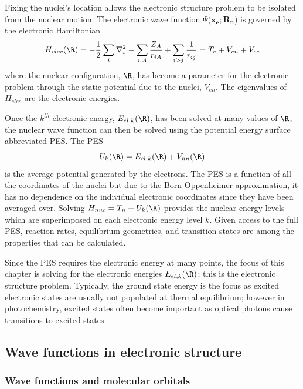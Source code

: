 \documentclass[11pt,oneside,final]{huthesis}%
\begin{document}
Fixing the nuclei's location allows the electronic structure problem to be isolated from the nuclear motion.  The electronic wave function $\Psi (\mathbf{x}_{{\mathbf e}};{{\mathbf R}}_{{\mathbf n}}$) is governed by the electronic Hamiltonian
\begin{equation}
	H_{elec} (\R )=-\frac{1}{2} \sum _{i} \nabla _{i}^{2} -\sum _{i,A} \frac{Z_{A} }{r_{iA} } +\sum _{i>j} \frac{1}{r_{ij} } =T_{e} +V_{en} +V_{ee} 
	\label{GrindEQ__7_2_}
\end{equation}
where the nuclear configuration, $\R$, has become a parameter for the electronic problem through the static potential due to the nuclei, $V_{en}$. The eigenvalues of $H_{elec}$ are the electronic energies.


Once the ${k}^{th}$ electronic energy, ${E}_{el,k}(\R)$, has been solved at many values of $\R$, the nuclear wave function can then be solved using the potential energy surface abbreviated PES.
The PES
$$U_k(\R) =E_{el,k}(\R) +V_{nn}(\R)$$
is the average potential generated by the electrons.     The PES is a function of all the coordinates of the nuclei but due to the Born-Oppenheimer approximation, it has no dependence on the individual electronic coordinates since they have been averaged over. Solving $H_{nuc }=T_{n} +U_k(\R)$ provides the nuclear energy levels which are superimposed on each electronic energy level $k$.  Given access to the full PES, reaction rates, equilibrium geometries, and transition states are among the properties that can be calculated.  %

Since the PES requires the electronic energy at many points, the focus of this chapter is solving for the electronic energies ${E}_{el,k}(\R)$; this is the {electronic structure problem}.  Typically, the ground state energy is the focus as excited electronic states are usually not populated at thermal equilibrium; however in photochemistry, excited states often become important as optical photons cause transitions to excited states.

\subsection{Wave functions in electronic structure}

\subsubsection{Wave functions and molecular orbitals}
\end{document}

